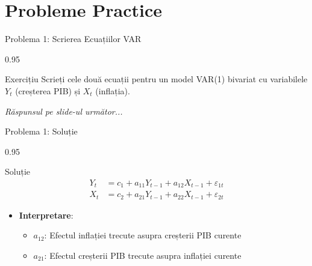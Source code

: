 \documentclass[9pt, aspectratio=169, t]{beamer}
\begin{document}
\section{Probleme Practice}

\begin{frame}{Problema 1: Scrierea Ecuațiilor VAR}
    \begin{cminipage}{0.95\textwidth}
    \begin{block}{Exercițiu}
        Scrieți cele două ecuații pentru un model VAR(1) bivariat cu variabilele $Y_t$ (creșterea PIB) și $X_t$ (inflația).
    \end{block}

    \vspace{0.5cm}
    \begin{flushright}\textit{Răspunsul pe slide-ul următor...}\end{flushright}
    \end{cminipage}
\end{frame}

\begin{frame}{Problema 1: Soluție}
    \begin{cminipage}{0.95\textwidth}
    \begin{exampleblock}{Soluție}
        \begin{align*}
            Y_t &= c_1 + a_{11} Y_{t-1} + a_{12} X_{t-1} + \varepsilon_{1t} \\[0.2cm]
            X_t &= c_2 + a_{21} Y_{t-1} + a_{22} X_{t-1} + \varepsilon_{2t}
        \end{align*}

        \begin{itemize}\setlength{\itemsep}{0pt}
            \item \textbf{Interpretare}:
            \begin{itemize}\setlength{\itemsep}{0pt}
                \item $a_{12}$: Efectul inflației trecute asupra creșterii PIB curente
                \item $a_{21}$: Efectul creșterii PIB trecute asupra inflației curente
            \end{itemize}
        \end{itemize}
    \end{exampleblock}
    \end{cminipage}
\end{frame}
\end{document}
